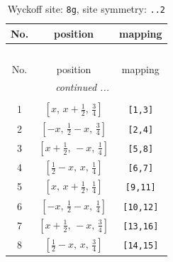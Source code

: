 \documentclass[fleqn,8pt]{jsarticle}
\begin{document}
\begin{longtable}{ccc}
\caption{Wyckoff site: {\tt 8g}, site symmetry: {\tt ..2}}
 \\
 \hline \hline
No. & position & mapping \\ \hline \endfirsthead

\multicolumn{2}{l}{\tablename\ \thetable{}} \\
 \hline \hline
No. & position & mapping \\ \hline \endhead

 \hline \hline
\multicolumn{2}{r}{\footnotesize\it continued ...} \\ \endfoot

 \hline \hline
\multicolumn{2}{r}{} \\ \endlastfoot

1 & $\left[ x,\, x + \frac{1}{2},\, \frac{3}{4} \right]$ & {\tt [1,3]} \\ \hline
2 & $\left[ - x,\, \frac{1}{2} - x,\, \frac{3}{4} \right]$ & {\tt [2,4]} \\ \hline
3 & $\left[ x + \frac{1}{2},\, - x,\, \frac{1}{4} \right]$ & {\tt [5,8]} \\ \hline
4 & $\left[ \frac{1}{2} - x,\, x,\, \frac{1}{4} \right]$ & {\tt [6,7]} \\ \hline
5 & $\left[ x,\, x + \frac{1}{2},\, \frac{1}{4} \right]$ & {\tt [9,11]} \\ \hline
6 & $\left[ - x,\, \frac{1}{2} - x,\, \frac{1}{4} \right]$ & {\tt [10,12]} \\ \hline
7 & $\left[ x + \frac{1}{2},\, - x,\, \frac{3}{4} \right]$ & {\tt [13,16]} \\ \hline
8 & $\left[ \frac{1}{2} - x,\, x,\, \frac{3}{4} \right]$ & {\tt [14,15]} \\
\end{longtable}
\renewcommand{\arraystretch}{1.2}
\end{document}

